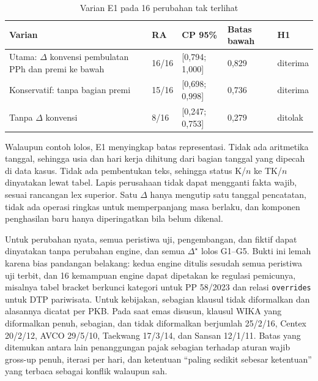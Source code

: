 \documentclass[journal,a4paper]{IEEEtran}
\makeatletter
\DeclareRobustCommand{\en}[1]{{\usefont{\f@encoding}{\f@family}{\f@series}{it}#1\/}}
\newcommand{\emas}{\star}
\makeatother
\begin{document}
\begin{table}[t]
\centering
\caption{Varian E1 pada 16 perubahan tak terlihat}
\label{tab:e1}
\scriptsize
\begin{tabularx}{\columnwidth}{@{}L P{0.7cm} P{1.25cm} P{0.8cm} P{0.9cm}@{}}
\toprule
\textbf{Varian} & \textbf{RA} & \textbf{CP 95\%} & \textbf{Batas bawah} & \textbf{H1} \\
\midrule
Utama: $\Delta$ konvensi pembulatan PPh dan premi ke bawah & 16/16 & [0,794; 1,000] & 0,829 & diterima \\
Konservatif: tanpa bagian premi & 15/16 & [0,698; 0,998] & 0,736 & diterima \\
Tanpa $\Delta$ konvensi & 8/16 & [0,247; 0,753] & 0,279 & ditolak \\
\bottomrule
\end{tabularx}
\end{table}

Walaupun contoh lolos, E1 menyingkap batas representasi. Tidak ada aritmetika tanggal, sehingga usia dan hari kerja dihitung dari bagian tanggal yang dipecah di data kasus. Tidak ada pembentukan teks, sehingga status K/$n$ ke TK/$n$ dinyatakan lewat tabel. Lapis perusahaan tidak dapat mengganti fakta wajib, sesuai rancangan \en{lex superior}. Satu $\Delta$ hanya mengutip satu tanggal pencatatan, tidak ada operasi ringkas untuk memperpanjang masa berlaku, dan komponen penghasilan baru hanya diperingatkan bila belum dikenal.

Untuk perubahan nyata, semua peristiwa uji, pengembangan, dan fiktif dapat dinyatakan tanpa perubahan \en{engine}, dan semua $\Delta^{\emas}$ lolos G1--G5. Bukti ini lemah karena bias pandangan belakang: kedua \en{engine} ditulis sesudah semua peristiwa uji terbit, dan 16 kemampuan \en{engine} dapat dipetakan ke regulasi pemicunya, misalnya tabel \en{bracket} berkunci kategori untuk PP 58/2023 dan relasi \texttt{overrides} untuk DTP pariwisata. Untuk kebijakan, sebagian klausul tidak diformalkan dan alasannya dicatat per PKB. Pada saat emas disusun, klausul WIKA yang diformalkan penuh, sebagian, dan tidak diformalkan berjumlah 25/2/16, Centex 20/2/12, AVCO 29/5/10, Taekwang 17/3/14, dan Sansan 12/1/11. Batas yang ditemukan antara lain penanggungan pajak sebagian terhadap aturan wajib \en{gross-up} penuh, iterasi per hari, dan ketentuan ``paling sedikit sebesar ketentuan'' yang terbaca sebagai konflik walaupun sah.
\end{document}
